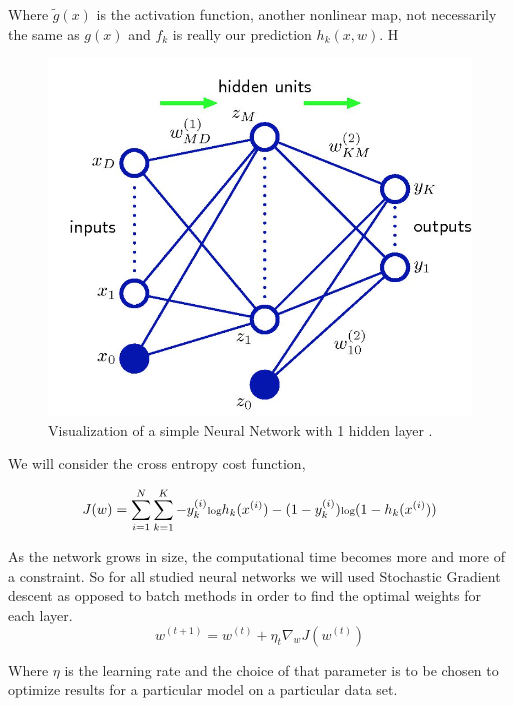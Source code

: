\documentclass[12pt, twocolumn]{article}
\begin{document}
Where $\tilde{g}(x)$ is the activation function, another nonlinear map, not necessarily the same as $g(x)$ and $f_k$ is really our prediction $h_k(x,w)$. H

\begin{figure}
\includegraphics[scale=.6]{simpleNN.png}

\caption{Visualization of a simple Neural Network with 1 hidden layer \cite{Bishop} . }
\label{fig:basicNN}
\end{figure}


We will consider the cross entropy cost function, 

\begin{equation}
\scriptsize
J(w)= \sum_{i=1}^N \sum_{k=1}^K -y^{(i)}_k \textrm{log}h_k(x^{(i)})- (1 -y^{(i)}_k) \textrm{log}(1 -h_k(x^{(i)}))
\end {equation}



As the network grows in size, the computational time becomes more and more of a constraint. So for all studied neural networks we will used Stochastic Gradient descent as opposed to batch methods in order to find the optimal weights for each layer. 
\begin{equation}
w^{(t+1)} = w^{(t)} + \eta_t \nabla_w J(w^{(t)})
\end{equation}

Where $\eta$ is  the learning rate and the choice of that parameter is to be chosen to optimize results for a particular model on a particular data set.
\end{document}
